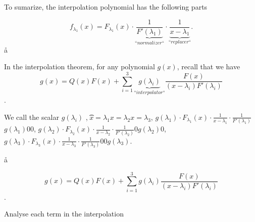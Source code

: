 To sumarize, the interpolation polynomial has the following parts

$$
f_{λ_1}(x) = F_{λ_1}(x)·\underbrace{\frac1{F'(λ_1)}}_{“normalizer“}\cdot\underbrace{\frac1{x-λ_1}}_{“replacer“}.
$$
%
%
%
%
%
%
%
%
\a\aa

In the interpolation theorem, for any polynomial $g(x)$, recall that we have
$$ g(x) = Q(x)F(x) + \sum_{i=1}^{3} \underbrace{g(\lambda_i)}_{“interpolator“}\frac{F(x)}{(x-\lambda_i)F'(\lambda_i)} $$.

We call the scalar $g(\lambda_i)$ , 
\vfill
\t{}{$x=λ_1$}{$x=λ_2$}{$x=λ_3$},
{$g(λ_1)·F_{λ_1}(x)\cdot\frac1{x-λ_1}·\frac1{F'(λ_1)}$}{$g(λ_1)$}00,
{$g(λ_2)·F_{λ_2}(x)\cdot\frac1{x-λ_2}·\frac1{F'(λ_2)}$}0{$g(λ_2)$}0,
{$g(λ_3)·F_{λ_3}(x)\cdot\frac1{x-λ_3}·\frac1{F'(λ_3)}$}00{$g(λ_3)$}.


\a\aa

$$ g(x) = Q(x)F(x) + \sum_{i=1}^{3} g(\lambda_i)\frac{F(x)}{(x-\lambda_i)F'(\lambda_i)} $$.

Analyse each term in the interpolation

